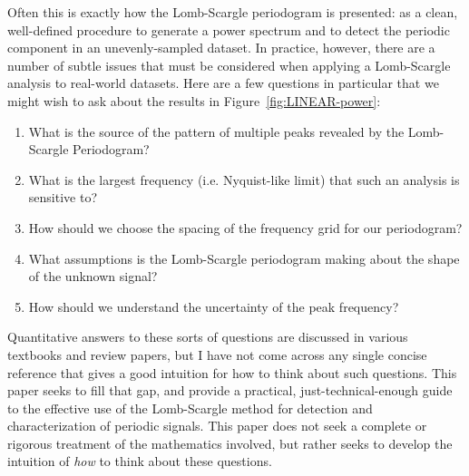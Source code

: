\documentclass[preprint]{aastex}
\newcommand{\fig}[1]{Figure~\ref{fig:#1}}
\begin{document}
Often this is exactly how the Lomb-Scargle periodogram is presented: as a
clean, well-defined procedure to generate a power spectrum and to
detect the periodic component in an unevenly-sampled dataset.
In practice, however, there are a number of subtle issues that must be
considered when applying a Lomb-Scargle analysis to real-world datasets.
Here are a few questions in particular that we might wish to ask about
the results in \fig{LINEAR-power}:
\begin{enumerate}
  \item What is the source of the pattern of multiple peaks revealed by the
    Lomb-Scargle Periodogram?
  \item What is the largest frequency (i.e. Nyquist-like limit) that such
    an analysis is sensitive to?
  \item How should we choose the spacing of the frequency grid for our
    periodogram?
  \item What assumptions is the Lomb-Scargle periodogram making about the
    shape of the unknown signal?
  \item How should we understand the uncertainty of the peak frequency?
\end{enumerate}
Quantitative answers to these sorts of questions are discussed in various
textbooks and review papers, but I have not come across any single concise
reference that gives a good intuition for how to think about such questions.
This paper seeks to fill that gap, and provide a practical,
just-technical-enough guide to the effective use of the Lomb-Scargle method
for detection and characterization of periodic signals.
This paper does not seek a complete or rigorous treatment of the mathematics
involved, but rather seeks to develop the intuition of {\it how} to think
about these questions.
\end{document}
